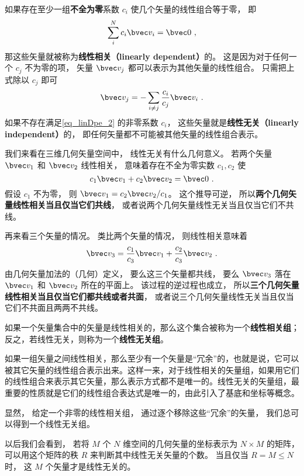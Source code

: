 

如果存在至少一组\textbf{不全为零}系数 $c_i$ 使几个矢量的线性组合等于零， 即
\begin{equation}\label{eq_linDpe_2}
\sum_i^N c_i \bvec v_i = \bvec 0~,
\end{equation}
那这些矢量就被称为\textbf{线性相关（linearly dependent）}的。 这是因为对于任何一个 $c_j$ 不为零的项， 矢量 $\bvec v_j$ 都可以表示为其他矢量的线性组合。 只需把上式除以 $c_j$ 即可
\begin{equation}\label{eq_linDpe_3}
\bvec v_j = -\sum_{i \ne j}\frac{c_i}{c_j} \bvec v_i~.
\end{equation}
如果不存在满足\autoref{eq_linDpe_2} 的非零系数 $c_i$， 这些矢量就是\textbf{线性无关（linearly independent）}的， 即任何矢量都不可能被其他矢量的线性组合表示。

\begin{example}{ }\label{ex_linDpe_1}
我们来看在三维几何矢量空间中， 线性无关有什么几何意义。 若两个矢量 $\bvec v_1$ 和 $\bvec v_2$ 线性相关， 意味着存在不全为零实数 $c_1, c_2$ 使
\begin{equation}
c_1 \bvec v_1 + c_2 \bvec v_2 = \bvec 0~.
\end{equation}
假设 $c_1$ 不为零， 则 $\bvec v_1 = c_2 \bvec v_2 / c_1$。 这个推导可逆， 所以\textbf{两个几何矢量线性相关当且仅当它们共线}， 或者说两个几何矢量线性无关当且仅当它们不共线。

再来看三个矢量的情况。 类比两个矢量的情况， 则线性相关意味着
\begin{equation}
\bvec v_3 = \frac{c_1}{c_3} \bvec v_1 +  \frac{c_2}{c_3} \bvec v_2~.
\end{equation}
由几何矢量加法的（几何）定义， 要么这三个矢量都共线， 要么 $\bvec v_3$ 落在 $\bvec v_1$ 和 $\bvec v_2$ 所在的平面上。 该过程的逆过程也成立， 所以\textbf{三个几何矢量线性相关当且仅当它们都共线或者共面}， 或者说三个几何矢量线性无关当且仅当它们不共面且两两不共线。
\end{example}

如果一个矢量集合中的矢量是线性相关的，那么这个集合被称为一个\textbf{线性相关组}；反之，若线性无关，则称为一个\textbf{线性无关组}。

如果一组矢量之间线性相关，那么至少有一个矢量是“冗余”的，也就是说，它可以被其它矢量的线性组合表示出来。这样一来，对于线性相关的矢量组，如果用它们的线性组合来表示其它矢量，那么表示方式都不是唯一的。线性无关的矢量组，最重要的性质就是它们的线性组合表达式是唯一的，由此引入了基底和坐标等概念。

显然， 给定一个非零的线性相关组， 通过逐个移除这些“冗余”的矢量， 我们总可以得到一个线性无关组。

以后我们会看到， 若将 $M$ 个 $N$ 维空间的几何矢量的坐标表示为 $N\times M$ 的矩阵， 可以用这个矩阵的秩 $R$ 来判断其中线性无关矢量的个数。 当且仅当 $R = M \leqslant N$ 时， 这 $M$ 个矢量才是线性无关的。
